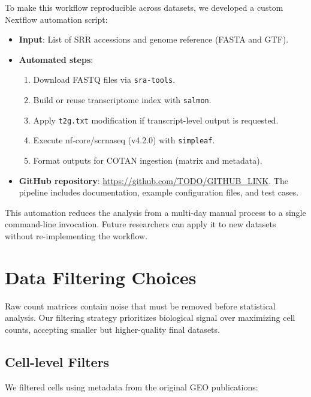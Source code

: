 To make this workflow reproducible across datasets, we developed a custom Nextflow automation script:

\begin{itemize}
    \item \textbf{Input}: List of SRR accessions and genome reference (FASTA and GTF).
    \item \textbf{Automated steps}:
    \begin{enumerate}
        \item Download FASTQ files via \texttt{sra-tools}.
        \item Build or reuse transcriptome index with \texttt{salmon}.
        \item Apply \texttt{t2g.txt} modification if transcript-level output is requested.
        \item Execute nf-core/scrnaseq (v4.2.0) with \texttt{simpleaf}.
        \item Format outputs for COTAN ingestion (matrix and metadata).
    \end{enumerate}
    \item \textbf{GitHub repository}: \url{https://github.com/TODO/GITHUB_LINK}. The pipeline includes documentation, example configuration files, and test cases.
\end{itemize}

This automation reduces the analysis from a multi-day manual process to a single command-line invocation. Future researchers can apply it to new datasets without re-implementing the workflow.

\section{Data Filtering Choices}

Raw count matrices contain noise that must be removed before statistical analysis. Our filtering strategy prioritizes biological signal over maximizing cell counts, accepting smaller but higher-quality final datasets.

\subsection*{Cell-level Filters}

We filtered cells using metadata from the original GEO publications:


